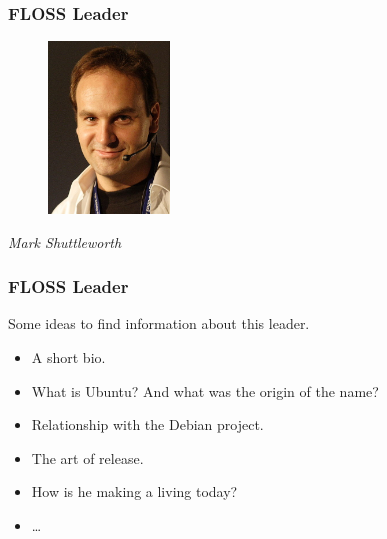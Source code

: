 \documentclass{beamer}
\begin{document}
\begin{frame}
\frametitle{FLOSS Leader}

\begin{figure}[h]
\begin{center}
  \includegraphics[height=1.80in]{figs/Mark_Shuttleworth.jpg}
\end{center}
\end{figure}

\pause

\begin{center}
{\it Mark Shuttleworth}
\end{center}

\end{frame}

\begin{frame}
\frametitle{FLOSS Leader}

Some ideas to find information about this leader.
\pause
\begin{itemize}
\item A short bio.
\item What is Ubuntu? And what was the origin of the name?
\item Relationship with the Debian project.
\item The art of release.
\item How is he making a living today?
\item \ldots
\end{itemize}

\end{frame}

\end{document}
